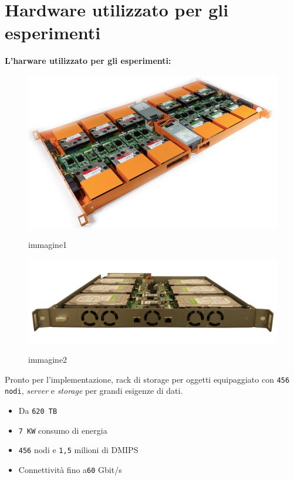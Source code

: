 \item
\section{Hardware utilizzato per gli esperimenti}
\textbf{L'harware utilizzato per gli esperimenti:} 
\begin{figure}[htbp]
\centering
\includegraphics[scale=0.40]{img/CY7x2.png}\\
\caption{immagine1 \label{figura1.10}}
\end{figure}



\begin{figure}[htbp]
\centering
\includegraphics[scale=0.30]{img/CY7.png}\\
\caption{immagine2 \label{figura1.11}}
\end{figure}


Pronto per l'implementazione, rack di storage per oggetti equipaggiato con \verb"456 nodi", \textit{server} e \textit{storage} per grandi esigenze di dati.\\
\begin{itemize}
\item 
Da \verb"620 TB"
\item
\verb"7 KW" consumo di energia
\item
\verb"456" nodi e \verb"1,5" milioni di DMIPS
\item
Connettivit\`{a} fino a\verb"60" Gbit/s
\end{itemize}


